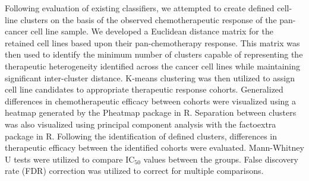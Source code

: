 \documentclass[10pt, letterpaper]{article}
\begin{document}
\begin{multicols*}{2}
Following evaluation of existing classifiers, we attempted to create defined cell-line clusters on the basis of the observed chemotherapeutic response of the pan-cancer cell line sample. We developed a Euclidean distance matrix for the retained cell lines based upon their pan-chemotherapy response. This matrix was then used to identify the minimum number of clusters capable of representing the therapeutic heterogeneity identified across the cancer cell lines while maintaining significant inter-cluster distance. K-means clustering was then utilized to assign cell line candidates to appropriate therapeutic response cohorts. Generalized differences in chemotherapeutic efficacy between cohorts were visualized using a heatmap generated by the Pheatmap package in R. Separation between clusters was also visualized using principal component analysis with the factoextra package in R. Following the identification of defined clusters, differences in therapeutic efficacy between the identified cohorts were evaluated. Mann-Whitney U tests were utilized to compare IC$_{50}$ values between the groups. False discovery rate (FDR) correction was utilized to correct for multiple comparisons.



\end{multicols*}
\end{document}
